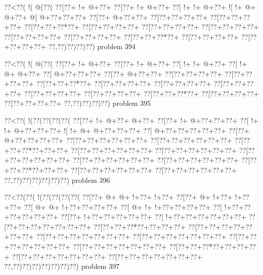 \vbox{\vbox{\goo
\0??<\0??(\- !(\- @(\0??(
\0??[\0??+\- !+\- @+\0??+
\0??[\0??+\- !+\- @+\0??+
\0??[\- !+\- !+\- @+\0??+
\- ![\- !+\- @+\- @+\0??+
\- @[\- @+\0??+\0??+\0??+
\0??[\0??+\- @+\0??+\0??+
\0??[\0??+\0??+\0??+\0??+
\0??[\0??+\0??+\0??+\0??+
\0??[\0??+\0??+\0??*\0??+
\0??[\0??+\0??+\0??+\0??+
\0??[\0??+\0??+\0??+\0??+
\0??[\0??+\0??+\0??+\0??+
\0??[\0??+\0??+\0??+\0??+
\0??[\0??+\0??+\0??+\0??+
\0??[\0??+\0??+\0??*\0??+
\0??[\0??+\0??+\0??+\0??+
\0??[\0??+\0??+\0??+\0??+
\0??,\0??)\0??)\0??)\0??)
}
\hfil problem 394\hfil\break
}

\vbox{\vbox{\goo
\0??<\0??(\- !(\- @(\0??(
\0??[\0??+\- !+\- @+\0??+
\0??[\0??+\- !+\- @+\0??+
\0??[\- !+\- !+\- @+\0??+
\0??[\- !+\- @+\- @+\0??+
\0??[\- @+\0??+\0??+\0??+
\0??[\0??+\- @+\0??+\0??+
\0??[\0??+\0??+\0??+\0??+
\0??[\0??+\0??+\0??+\0??+
\0??[\0??+\0??+\0??*\0??+
\0??[\0??+\0??+\0??+\0??+
\0??[\0??+\0??+\0??+\0??+
\0??[\0??+\0??+\0??+\0??+
\0??[\0??+\0??+\0??+\0??+
\0??[\0??+\0??+\0??+\0??+
\0??[\0??+\0??+\0??*\0??+
\0??[\0??+\0??+\0??+\0??+
\0??[\0??+\0??+\0??+\0??+
\0??,\0??)\0??)\0??)\0??)
}
\hfil problem 395\hfil\break
}

\vbox{\vbox{\goo
\0??<\0??(\- !(\0??(\0??(\0??(\0??(
\0??[\0??+\- !+\- @+\0??+\- @+\0??+
\0??[\0??+\- !+\- @+\0??+\0??+\0??+
\0??[\- !+\- !+\- @+\0??+\0??+\0??+
\- ![\- !+\- @+\- @+\0??+\0??+\0??+
\0??[\- @+\0??+\0??+\0??+\0??+\0??+
\0??[\0??+\- @+\0??+\0??+\0??+\0??+
\0??[\0??+\0??+\0??+\0??+\0??+\0??+
\0??[\0??+\0??+\0??+\0??+\0??+\0??+
\0??[\0??+\0??+\0??*\0??+\0??+\0??+
\0??[\0??+\0??+\0??+\0??+\0??+\0??+
\0??[\0??+\0??+\0??+\0??+\0??+\0??+
\0??[\0??+\0??+\0??+\0??+\0??+\0??+
\0??[\0??+\0??+\0??+\0??+\0??+\0??+
\0??[\0??+\0??+\0??+\0??+\0??+\0??+
\0??[\0??+\0??+\0??*\0??+\0??+\0??+
\0??[\0??+\0??+\0??+\0??+\0??+\0??+
\0??[\0??+\0??+\0??+\0??+\0??+\0??+
\0??,\0??)\0??)\0??)\0??)\0??)\0??)
}
\hfil problem 396\hfil\break
}

\vbox{\vbox{\goo
\0??<\0??(\0??(\- !(\0??(\0??(\0??(\0??(
\0??[\0??+\- @+\- @+\- !+\0??+\- !+\0??+
\0??[\0??+\- @+\- !+\0??+\- !+\0??+\0??+
\0??[\- @+\- @+\- !+\0??+\0??+\0??+\0??+
\0??[\- @+\- !+\- !+\0??+\0??+\0??+\0??+
\0??[\- !+\0??+\0??+\0??+\0??+\0??+\0??+
\0??[\0??+\- !+\0??+\0??+\0??+\0??+\0??+
\0??[\- !+\0??+\0??+\0??+\0??+\0??+\0??+
\0??[\0??+\0??+\0??+\0??+\0??+\0??+\0??+
\0??[\0??+\0??+\0??*\0??+\0??+\0??+\0??+
\0??[\0??+\0??+\0??+\0??+\0??+\0??+\0??+
\0??[\0??+\0??+\0??+\0??+\0??+\0??+\0??+
\0??[\0??+\0??+\0??+\0??+\0??+\0??+\0??+
\0??[\0??+\0??+\0??+\0??+\0??+\0??+\0??+
\0??[\0??+\0??+\0??+\0??+\0??+\0??+\0??+
\0??[\0??+\0??+\0??*\0??+\0??+\0??+\0??+
\0??[\0??+\0??+\0??+\0??+\0??+\0??+\0??+
\0??[\0??+\0??+\0??+\0??+\0??+\0??+\0??+
\0??,\0??)\0??)\0??)\0??)\0??)\0??)\0??)
}
\hfil problem 397\hfil\break
}

